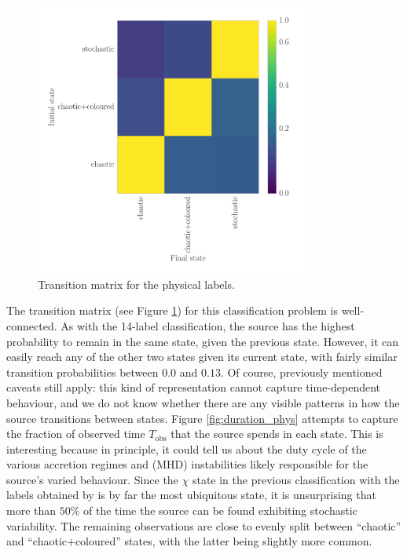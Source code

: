 \documentclass[12pt]{emulateapj}
\begin{document}
\begin{figure}[htbp]
\begin{center}
\includegraphics[width=9cm]{grs1915_supervised_phys_transmat.pdf}
\caption{Transition matrix for the physical labels.} 
\label{fig:transmat_phys}
\end{center}
\end{figure}

The transition matrix (see Figure \ref{fig:transmat_phys}) for this classification problem is well-connected. As with the 14-label classification, the source has the 
highest probability to remain in the same state, given the previous state. However, it can easily reach any of the other two states given its current state, with fairly 
similar transition probabilities between $0.0$ and $0.13$. Of course, previously mentioned caveats still apply: this kind of representation cannot capture time-dependent behaviour, and we do not know whether there are any visible patterns in how the source transitions between states. Figure \ref{fig:duration_phys} attempts to capture the fraction of observed time $T_\mathrm{obs}$ that the source spends in each state. This is interesting because in principle, it could tell us about the 
duty cycle of the various accretion regimes and (MHD) instabilities likely responsible for the source's varied behaviour.
Since the $\chi$ state in the previous classification with the labels obtained by \citet{belloni2000} is by far the most ubiquitous state, it is unsurprising that more 
than $50\%$ of the time the source can be found exhibiting stochastic variability. The remaining observations are close to evenly split between ``chaotic'' and 
``chaotic+coloured'' states, with the latter being slightly more common.
\end{document}
